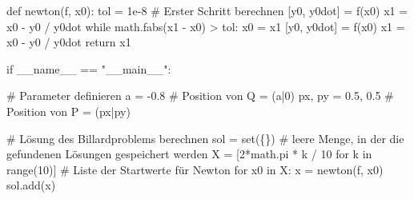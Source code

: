 \documentclass[
  letterpaper,
  DIV=11,
  oneside]{scrreprt}
\newenvironment{Shaded}{\begin{snugshade}}{\end{snugshade}}
\newcommand{\BuiltInTok}[1]{\textcolor[rgb]{0.00,0.23,0.31}{#1}}
\newcommand{\CommentTok}[1]{\textcolor[rgb]{0.37,0.37,0.37}{#1}}
\newcommand{\ControlFlowTok}[1]{\textcolor[rgb]{0.00,0.23,0.31}{#1}}
\newcommand{\DecValTok}[1]{\textcolor[rgb]{0.68,0.00,0.00}{#1}}
\newcommand{\FloatTok}[1]{\textcolor[rgb]{0.68,0.00,0.00}{#1}}
\newcommand{\KeywordTok}[1]{\textcolor[rgb]{0.00,0.23,0.31}{#1}}
\newcommand{\NormalTok}[1]{\textcolor[rgb]{0.00,0.23,0.31}{#1}}
\newcommand{\OperatorTok}[1]{\textcolor[rgb]{0.37,0.37,0.37}{#1}}
\newcommand{\StringTok}[1]{\textcolor[rgb]{0.13,0.47,0.30}{#1}}
\newcommand{\VariableTok}[1]{\textcolor[rgb]{0.07,0.07,0.07}{#1}}
\theoremstyle{definition}
\theoremstyle{definition}
\theoremstyle{remark}
\begin{document}
\begin{tcolorbox}
\begin{Shaded}
\begin{Highlighting}[]
\KeywordTok{def}\NormalTok{ newton(f, x0):}
\NormalTok{    tol }\OperatorTok{=} \FloatTok{1e{-}8}
    \CommentTok{\# Erster Schritt berechnen}
\NormalTok{    [y0, y0dot] }\OperatorTok{=}\NormalTok{ f(x0)}
\NormalTok{    x1 }\OperatorTok{=}\NormalTok{ x0 }\OperatorTok{{-}}\NormalTok{ y0 }\OperatorTok{/}\NormalTok{ y0dot}
    \ControlFlowTok{while}\NormalTok{ math.fabs(x1 }\OperatorTok{{-}}\NormalTok{ x0) }\OperatorTok{\textgreater{}}\NormalTok{ tol:}
\NormalTok{        x0 }\OperatorTok{=}\NormalTok{ x1}
\NormalTok{        [y0, y0dot] }\OperatorTok{=}\NormalTok{ f(x0)}
\NormalTok{        x1 }\OperatorTok{=}\NormalTok{ x0 }\OperatorTok{{-}}\NormalTok{ y0 }\OperatorTok{/}\NormalTok{ y0dot}
    \ControlFlowTok{return}\NormalTok{ x1 }


\ControlFlowTok{if} \VariableTok{\_\_name\_\_} \OperatorTok{==} \StringTok{"\_\_main\_\_"}\NormalTok{:}

    \CommentTok{\# Parameter definieren}
\NormalTok{    a }\OperatorTok{=} \OperatorTok{{-}}\FloatTok{0.8}           \CommentTok{\# Position von Q = (a|0)}
\NormalTok{    px, py }\OperatorTok{=} \FloatTok{0.5}\NormalTok{, }\FloatTok{0.5}  \CommentTok{\# Position von P = (px|py)}

    \CommentTok{\# Lösung des Billardproblems berechnen}
\NormalTok{    sol }\OperatorTok{=} \BuiltInTok{set}\NormalTok{(\{\}) }\CommentTok{\# leere Menge, in der die gefundenen Lösungen gespeichert werden}
\NormalTok{    X }\OperatorTok{=}\NormalTok{ [}\DecValTok{2}\OperatorTok{*}\NormalTok{math.pi }\OperatorTok{*}\NormalTok{ k }\OperatorTok{/} \DecValTok{10} \ControlFlowTok{for}\NormalTok{ k }\KeywordTok{in} \BuiltInTok{range}\NormalTok{(}\DecValTok{10}\NormalTok{)]  }\CommentTok{\# Liste der Startwerte für Newton}
    \ControlFlowTok{for}\NormalTok{ x0 }\KeywordTok{in}\NormalTok{ X:}
\NormalTok{        x }\OperatorTok{=}\NormalTok{ newton(f, x0)}
\NormalTok{        sol.add(x)}


\end{Highlighting}
\end{Shaded}
\end{tcolorbox}
\end{document}

